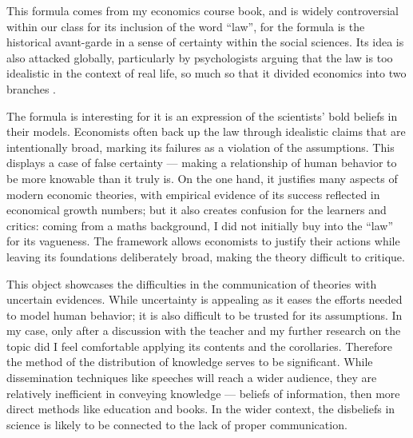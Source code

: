 \documentclass[a4paper,11pt]{article}
\begin{document}
This formula comes from my economics course book, and is widely controversial within our class for its inclusion of the word ``law'', for the formula is the historical avant-garde in a sense of certainty within the social sciences. Its idea is also attacked globally, particularly by psychologists arguing that the law is too idealistic in the context of real life, so much so that it divided economics into two branches \parencite{DKahneman}.

The formula is interesting for it is an expression of the scientists' bold beliefs in their models. Economists often back up the law through idealistic claims that are intentionally broad, marking its failures as a violation of the assumptions. This displays a case of false certainty --- making a relationship of human behavior to be more knowable than it truly is. On the one hand, it justifies many aspects of modern economic theories, with empirical evidence of its success reflected in economical growth numbers; but it also creates confusion for the learners and critics: coming from a maths background, I did not initially buy into the ``law'' for its vagueness. The framework allows economists to justify their actions while leaving its foundations deliberately broad, making the theory difficult to critique.

This object showcases the difficulties in the communication of theories with uncertain evidences.  While uncertainty is appealing as it eases the efforts needed to model human behavior; it is also difficult to be trusted for its assumptions. In my case, only after a discussion with the teacher and my further research on the topic did I feel comfortable applying its contents and the corollaries. Therefore the method of the distribution of knowledge serves to be significant. While dissemination techniques like speeches will reach a wider audience, they are relatively inefficient in conveying knowledge --- beliefs of information, then more direct methods like education and books. In the wider context, the disbeliefs in science is likely to be connected to the lack of proper communication.

\end{document}
